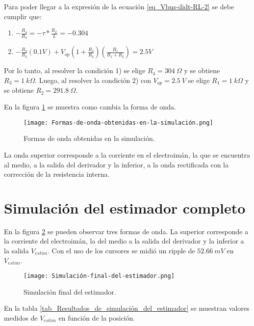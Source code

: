 Para poder llegar a la expresión de la ecuación \ref{eq_Vbus-didt-RL-2} se debe cumplir que:

\begin{enumerate}
	\item  $-\frac{R_4}{R_3}=- \tau *\frac{R_L}{L}= -0.304$  
	
	\item  $-\frac{R_4}{R_3}(0.1V)+V_{op}(1+\frac{ R_4}{R_3})(\frac{R_1}{R_1+R_2}) = 2.5V$     
\end{enumerate}

Por lo tanto, al resolver la condición 1) se elige $R_4 = 304\: \Omega$ y se obtiene $R_3=1\:k\Omega$. Luego, al resolver la condición 2) con $V_{op}=2.5\:V$ se elige $R_1=1\:k\Omega$ y se obtiene $R_{2}=291.8\:\Omega$.

En la figura \ref{fig:img_Formas_de_onda_obtenidas_en_la_simulación} se muestra como cambia la forma de onda.

\begin{figure}[H]
	\centering
	\texttt{[image: Formas-de-onda-obtenidas-en-la-simulación.png]}
	\caption{Formas de onda obtenidas en la simulación.}
	\label{fig:img_Formas_de_onda_obtenidas_en_la_simulación}
\end{figure}

La onda superior corresponde a la corriente en el electroimán, la que se encuentra al medio, a la salida del derivador y la inferior, a la onda rectificada con la corrección de la resistencia interna.


\section{Simulación del estimador completo}

En la figura \ref{fig:img_Simulación_final_del_estimado} se pueden observar tres formas de onda. La superior corresponde a la corriente del electroimán, la del medio a la salida del derivador y la inferior a la salida $V_{estim}$. Con el uso de los cursores se midió un ripple de $52.66\:mV $ en $V_{estim}$.

\begin{figure}[H]
	\centering
	\texttt{[image: Simulación-final-del-estimador.png]}
	\caption{Simulación final del estimador.}
	\label{fig:img_Simulación_final_del_estimado}
\end{figure}

En la tabla \ref{tab_Resultados_de_simulación_del_estimador} se muestran valores medidos de $V_{estim}$ en función de la posición.

